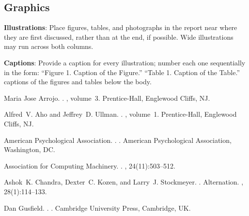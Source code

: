\documentclass[11pt]{article}
\begin{document}
\subsection{Graphics}

{\bf Illustrations}: Place figures, tables, and photographs in the
report near where they are first discussed, rather than at the end, if
possible.  Wide illustrations may run across both columns.

{\bf Captions}: Provide a caption for every illustration; number each one
sequentially in the form:  ``Figure 1. Caption of the Figure.'' ``Table 1.
Caption of the Table.''  captions of the figures and
tables below the body.

\begin{thebibliography}{}

Maria Jose Arrojo.
.
, volume~3.
\newblock Prentice-{Hall}, Englewood Cliffs, NJ.

Alfred~V. Aho and Jeffrey~D. Ullman.
.
, volume~1.
\newblock Prentice-{Hall}, Englewood Cliffs, NJ.

{American Psychological Association}.
.
.
\newblock American Psychological Association, Washington, DC.

{Association for Computing Machinery}.
.
, 24(11):503--512.

Ashok~K. Chandra, Dexter~C. Kozen, and Larry~J. Stockmeyer.
.
\newblock Alternation.
,
  28(1):114--133.

Dan Gusfield.
.
.
\newblock Cambridge University Press, Cambridge, UK.

\end{thebibliography}
\end{document}
